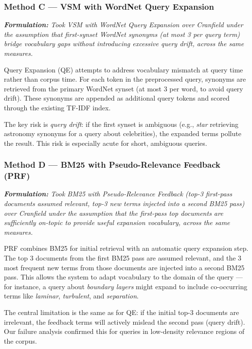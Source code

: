 \documentclass{article}
\begin{document}
\subsubsection{Method C --- VSM with WordNet Query Expansion}

\textit{\textbf{Formulation:} Took VSM with WordNet Query Expansion over Cranfield under the assumption that first-synset WordNet synonyms (at most 3 per query term) bridge vocabulary gaps without introducing excessive query drift, across the same measures.}

Query Expansion (QE) attempts to address vocabulary mismatch at query time rather than corpus time. For each token in the preprocessed query, synonyms are retrieved from the primary WordNet synset (at most 3 per word, to avoid query drift). These synonyms are appended as additional query tokens and scored through the existing TF-IDF index.

The key risk is \emph{query drift}: if the first synset is ambiguous (e.g., \textit{star} retrieving astronomy synonyms for a query about celebrities), the expanded terms pollute the result. This risk is especially acute for short, ambiguous queries.

\subsubsection{Method D --- BM25 with Pseudo-Relevance Feedback (PRF)}

\textit{\textbf{Formulation:} Took BM25 with Pseudo-Relevance Feedback (top-3 first-pass documents assumed relevant, top-3 new terms injected into a second BM25 pass) over Cranfield under the assumption that the first-pass top documents are sufficiently on-topic to provide useful expansion vocabulary, across the same measures.}

PRF combines BM25 for initial retrieval with an automatic query expansion step. The top 3 documents from the first BM25 pass are assumed relevant, and the 3 most frequent new terms from those documents are injected into a second BM25 pass. This allows the system to adapt vocabulary to the domain of the query --- for instance, a query about \textit{boundary layers} might expand to include co-occurring terms like \textit{laminar}, \textit{turbulent}, and \textit{separation}.

The central limitation is the same as for QE: if the initial top-3 documents are irrelevant, the feedback terms will actively mislead the second pass (query drift). Our failure analysis confirmed this for queries in low-density relevance regions of the corpus.
\end{document}
